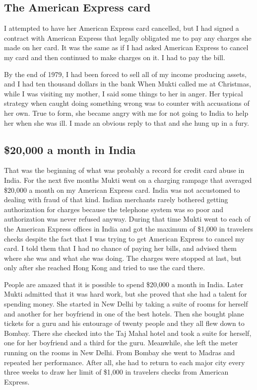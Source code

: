 \documentclass[a5paper,10pt,english]{book}
\begin{document}
\subsection{The American Express card}
\label{\detokenize{psychopaths:the-american-express-card}}
\sphinxAtStartPar
I attempted to have her American Express card cancelled, but I had
signed a contract with American Express that legally obligated me to pay
any charges she made on her card. It was the same as if I had asked
American Express to cancel my card and then continued to make charges on
it. I had to pay the bill.

\sphinxAtStartPar
By the end of 1979, I had been forced to sell all of my income producing
assets, and I had ten thousand dollars in the bank When Mukti called me
at Christmas, while I was visiting my mother, I said some things to her
in anger. Her typical strategy when caught doing something wrong was to
counter with accusations of her own. True to form, she became angry with
me for not going to India to help her when she was ill. I made an
obvious reply to that and she hung up in a fury.


\subsection{\$20,000 a month in India}
\label{\detokenize{psychopaths:a-month-in-india}}
\sphinxAtStartPar
That was the beginning of what was probably a record for credit card
abuse in India. For the next five months Mukti went on a charging
rampage that averaged \$20,000 a month on my American Express card. India
was not accustomed to dealing with fraud of that kind. Indian merchants
rarely bothered getting authorization for charges because the telephone
system was so poor and authorization was never refused anyway. During
that time Mukti went to each of the American Express offices in India
and got the maximum of \$1,000 in travelers checks despite the fact that
I was trying to get American Express to cancel my card. I told them that
I had no chance of paying her bills, and advised them where she was and
what she was doing. The charges were stopped at last, but only after she
reached Hong Kong and tried to use the card there.

\sphinxAtStartPar
People are amazed that it is possible to spend \$20,000 a month in India.
Later Mukti admitted that it was hard work, but she proved that she had
a talent for spending money. She started in New Delhi by taking a suite
of rooms for herself and another for her boyfriend in one of the best
hotels. Then she bought plane tickets for a guru and his entourage of
twenty people and they all flew down to Bombay. There she checked into
the Taj Mahal hotel and took a suite for herself, one for her boyfriend
and a third for the guru. Meanwhile, she left the meter running on the
rooms in New Delhi. From Bombay she went to Madras and repeated her
performance. After all, she had to return to each major city every three
weeks to draw her limit of \$1,000 in travelers checks from American
Express.
\end{document}
